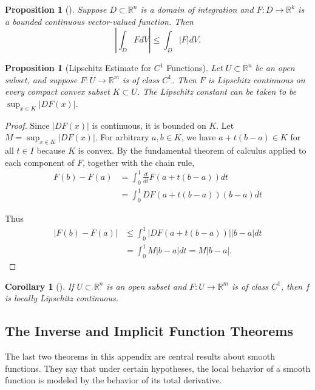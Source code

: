 \documentclass[reqno]{amsart}
\theoremstyle{plain}%
\newtheorem{proposition}[theorem]{Proposition}
\newtheorem{corollary}[theorem]{Corollary}
\theoremstyle{definition}
\theoremstyle{remark}
\begin{document}
        \begin{proposition}[]
        Suppose $D \subset \mathbb{R}^{n}$ is a domain of integration and
        $F  \colon D \to \mathbb{R}^{k}$ is a bounded continuous vector-valued
        function. Then
        \[
        \left| \int_D F dV \right| \le \int_D \left| F \right| dV.
        \] 
        \end{proposition}

        \begin{proposition}[Lipschitz Estimate for $C^{1}$ Functions]
        Let $U \subset \mathbb{R}^{n}$ be an open subset, and suppose
        $F  \colon U \to \mathbb{R}^{m}$ is of class $C^{1}$. Then $F$ is Lipschitz
        continuous on every compact convex subset $K \subset U$. The Lipschitz
        constant can be taken to be $\sup_{x \in K}\left| DF(x) \right| $.
        \end{proposition}


        \begin{proof}
        Since $\left| DF (x) \right| $ is continuous, it is bounded on $K$. Let
        $M = \sup_{x \in K} \left| DF(x) \right| $. For arbitrary $a,b \in K$, we
        have $a+t (b-a) \in K$ for all $t \in I$ because $K$ is convex. By the
        fundamental theorem of calculus applied to each component of $F$, together
        with the chain rule,
        \begin{align*}
            F(b) - F(a) 
            &= \int_{0}^{1} \frac{d}{dt}F\left( a+t(b-a) \right) dt\\
            &= \int_{0}^{1} DF\left( a+t(b-a) \right) (b-a) dt 
        \end{align*}

        Thus
        \begin{align*}
            \left| F(b) - F(a) \right| 
            &\le \int_{0}^{1} \left| DF\left( a+t(b-a) \right)  \right| 
            \left| b-a \right| dt\\
            &= \int_{0}^{1} M \left| b-a \right| dt = M \left| b-a \right|.
        \end{align*}
        \end{proof}


        \begin{corollary}[]
        If $U \subset \mathbb{R}^{n}$ is an open subset and $F  \colon U \to 
        \mathbb{R}^{m}$ is of class $C^{1}$, then $f$ is locally
        Lipschitz continuous.
        \end{corollary}

    \subsection*{The Inverse and Implicit Function Theorems}
        The last two theorems in this appendix are central results about smooth
        functions. They say that under certain hypotheses, the local behavior of
        a smooth function is modeled by the behavior of its total derivative.
\end{document}
